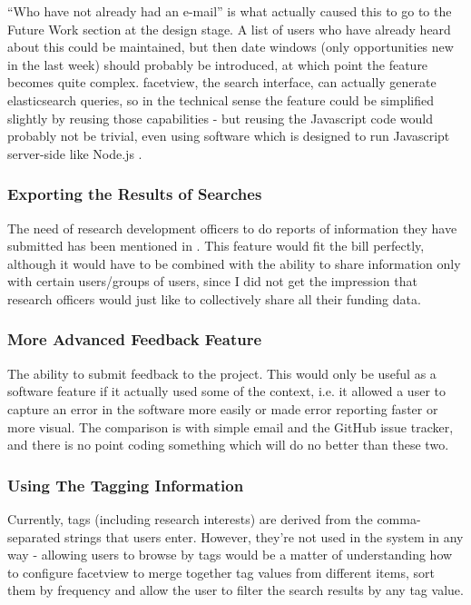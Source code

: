 ``Who have not already had an e-mail'' is what actually caused this to go to the Future Work section at the design stage. A list of users who have already heard about this could be maintained, but then date windows (only opportunities new in the last week) should probably be introduced, at which point the feature becomes quite complex. facetview, the search interface, can actually generate elasticsearch queries, so in the technical sense the feature could be simplified slightly by reusing those capabilities - but reusing the Javascript code would probably not be trivial, even using software which is designed to run Javascript server-side like Node.js .

\label{future-research-officers-reports}

\subsubsection{Exporting the Results of Searches}
The need of research development officers to do reports of information they have submitted has been mentioned in . This feature would fit the bill perfectly, although it would have to be combined with the ability to share information only with certain users/groups of users, since I did not get the impression that research officers would just like to collectively share all their funding data.

\subsubsection{More Advanced Feedback Feature}
The ability to submit feedback to the project. This would only be useful as a software feature if it actually used some of the context, i.e. it allowed a user to capture an error in the software more easily or made error reporting faster or more visual. The comparison is with simple email and the GitHub issue tracker, and there is no point coding something which will do no better than these two.

\subsubsection{Using The Tagging Information}
Currently, tags (including research interests) are derived from the comma-separated strings that users enter. However, they're not used in the system in any way - allowing users to browse by tags would be a matter of understanding how to configure facetview to merge together tag values from different items, sort them by frequency and allow the user to filter the search results by any tag value.

